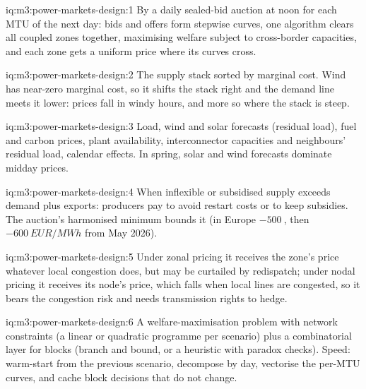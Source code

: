 \begin{solution}{iq:m3:power-markets-design:1}
By a daily sealed-bid auction at noon for each MTU of the next day: bids and offers form
stepwise curves, one algorithm clears all coupled zones together, maximising welfare subject
to cross-border capacities, and each zone gets a uniform price where its curves cross.
\end{solution}

\begin{solution}{iq:m3:power-markets-design:2}
The supply stack sorted by marginal cost. Wind has near-zero marginal cost, so it shifts the
stack right and the demand line meets it lower: prices fall in windy hours, and more so
where the stack is steep.
\end{solution}

\begin{solution}{iq:m3:power-markets-design:3}
Load, wind and solar forecasts (residual load), fuel and carbon prices, plant availability,
interconnector capacities and neighbours' residual load, calendar effects. In spring, solar
and wind forecasts dominate midday prices.
\end{solution}

\begin{solution}{iq:m3:power-markets-design:4}
When inflexible or subsidised supply exceeds demand plus exports: producers pay to avoid
restart costs or to keep subsidies. The auction's harmonised minimum bounds it (in Europe
$-\qty{500}{}$, then $-\qty{600}{EUR/MWh}$ from May 2026).
\end{solution}

\begin{solution}{iq:m3:power-markets-design:5}
Under zonal pricing it receives the zone's price whatever local congestion does, but may be
curtailed by redispatch; under nodal pricing it receives its node's price, which falls when
local lines are congested, so it bears the congestion risk and needs transmission rights to
hedge.
\end{solution}

\begin{solution}{iq:m3:power-markets-design:6}
A welfare-maximisation problem with network constraints (a linear or quadratic programme
per scenario) plus a combinatorial layer for blocks (branch and bound, or a heuristic with
paradox checks). Speed: warm-start from the previous scenario, decompose by day, vectorise
the per-MTU curves, and cache block decisions that do not change.
\end{solution}

